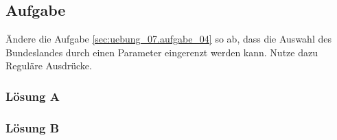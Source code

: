 \subsection{Aufgabe}
\label{sec:uebung_07.aufgabe_05}
Ändere die Aufgabe \ref{sec:uebung_07.aufgabe_04} so ab, dass die Auswahl des Bundeslandes durch einen Parameter eingerenzt werden kann. Nutze dazu Reguläre Ausdrücke.

\subsubsection*{Lösung A}
\label{sec:uebung_07.aufgabe_05.loesung.A}

\subsubsection*{Lösung B}
\label{sec:uebung_07.aufgabe_05.loesung.B}

